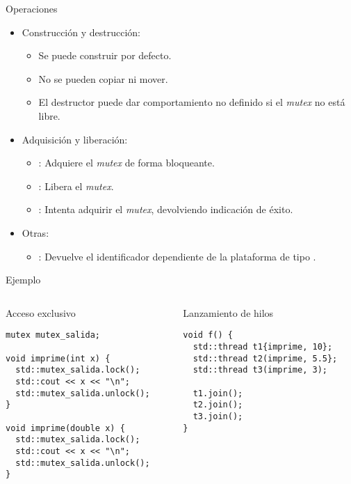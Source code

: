 \begin{frame}{Operaciones}
\begin{itemize}
  \item Construcción y destrucción:
    \begin{itemize}
      \item Se puede construir por defecto.
      \item No se pueden copiar ni mover.
      \item El destructor puede dar comportamiento no definido si el \emph{mutex} no está libre.
    \end{itemize}
  \vfill
  \item Adquisición y liberación:
    \begin{itemize}
      \item {}: Adquiere el \emph{mutex} de forma bloqueante.
      \item {}: Libera el \emph{mutex}.
      \item {}: Intenta adquirir el \emph{mutex}, devolviendo indicación de éxito.
    \end{itemize}
  \vfill
  \item Otras:
    \begin{itemize}
      \item {}: Devuelve el identificador dependiente de la plataforma de tipo
            .
    \end{itemize}
\end{itemize}
\end{frame}

\begin{frame}[fragile]{Ejemplo}
\begin{columns}

\begin{column}{.5\textwidth}
\begin{block}{Acceso exclusivo}
\begin{lstlisting}
mutex mutex_salida;

void imprime(int x) {
  std::mutex_salida.lock();
  std::cout << x << "\n";
  std::mutex_salida.unlock();
}

void imprime(double x) {
  std::mutex_salida.lock();
  std::cout << x << "\n";
  std::mutex_salida.unlock();
}
\end{lstlisting}
\end{block}
\end{column}

\begin{column}{.5\textwidth}
\begin{block}{Lanzamiento de hilos}
\begin{lstlisting}
void f() {
  std::thread t1{imprime, 10};
  std::thread t2(imprime, 5.5};
  std::thread t3(imprime, 3);
 
  t1.join(); 
  t2.join(); 
  t3.join();
}
\end{lstlisting}
\end{block}
\end{column}

\end{columns}
\end{frame}


